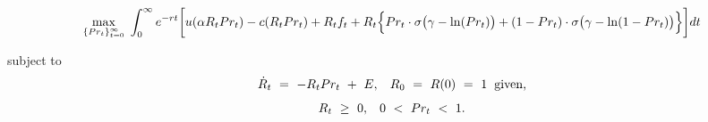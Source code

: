 \begin{footnotesize}
\begin{equation}
\begin{split}
     \underset{\{Pr_{t}\}_{t = 0}^{\infty}}{\max} \hspace{0.1cm} \int_{0}^{\infty} e^{-rt} \bigg[ u(\alpha R_{t} Pr_{t}) - c(R_{t} Pr_{t}) + R_{t} f_{t} + R_{t} \Big\{ Pr_{t} \cdot \sigma \big( \gamma - \ln(Pr_{t}) \big) + (1 - Pr_{t}) \cdot \sigma \big( \gamma - \ln(1 - Pr_{t}) \big) \Big\} \bigg] dt
\end{split}
\label{Equation:Social-Planners-Problem_Formulation}
\end{equation}
\end{footnotesize}
subject to
\begin{equation}
\begin{split}
    \dot{R}_{t} \ = \ -R_{t}Pr_{t} \ + \ E, \hspace{0.3cm} R_{0} \ = \ R(0) \ = \ 1 \hspace{0.2cm} \text{given,}
\end{split}
\label{Equation:Social-Planners-Problem_Law-of-Motion}
\end{equation}
\begin{equation}
\begin{split}
    R_{t} \ \geq \ 0, \hspace{0.3cm} 0 \ < \ Pr_{t} \ < \ 1.
\end{split}
\end{equation}